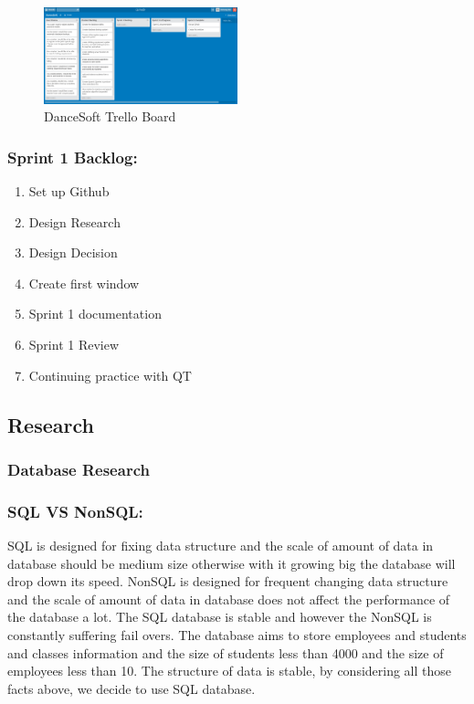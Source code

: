\begin{figure}
\caption{DanceSoft Trello Board}
\centering
\includegraphics[width=0.5\textwidth]{d1}
\end{figure}



\subsubsection{Sprint 1 Backlog:}

\begin{enumerate}
\item Set up Github
\item Design Research
\item Design Decision
\item Create first window
\item Sprint 1 documentation
\item Sprint 1 Review
\item Continuing practice with QT

\end{enumerate}

\subsection{Research}

\subsubsection{Database Research}

\subsubsection{SQL VS NonSQL:}
SQL is designed for fixing data structure and the scale of amount of data in database should be medium size otherwise with it growing big the database will drop down its speed. NonSQL is designed for frequent changing data structure and the scale of amount of data in database does not affect the performance of the database a lot. The SQL database is stable and however the NonSQL is constantly suffering fail overs. The database aims to store employees and students and classes information and the size of students less than 4000 and the size of employees less than 10. The structure of data is stable, by considering all those facts above, we decide to use SQL database.\\

